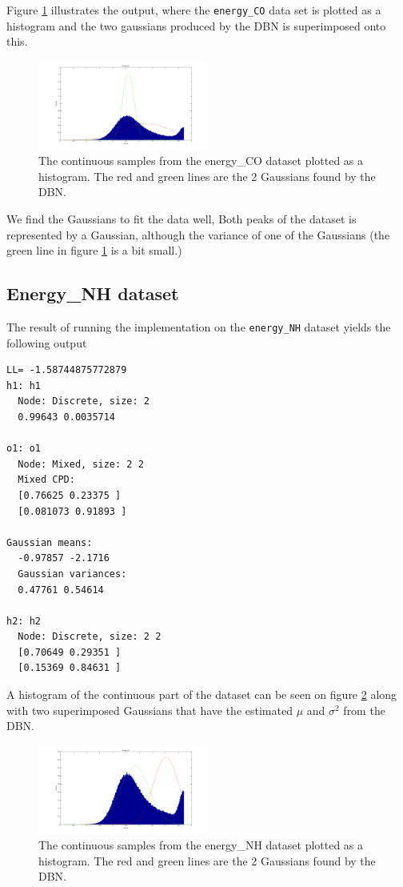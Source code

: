 \documentclass[10pt, journal, compsoc, a4paper]{IEEEtran}
\begin{document}
Figure \ref{fig4} illustrates the output, where the \texttt{energy\_CO} data set is plotted as a histogram and the two gaussians produced by the DBN is superimposed onto this. 

\begin{figure}[ht]
\centering
\includegraphics[width=0.5\textwidth]{figures/fig4.png}
\caption{The continuous samples from the energy\_CO dataset plotted as a histogram. The red and green lines are the 2 Gaussians found by the DBN.}
\label{fig4}
\end{figure}

We find the Gaussians to fit the data well, Both peaks of the dataset is represented by a Gaussian, although the variance of one of the Gaussians (the green line in figure \ref{fig4} is a bit small.)


\subsection{Energy\_NH dataset} %
\label{sub:energy_nh_dataset}
The result of running the implementation on the \texttt{energy\_NH} dataset yields the following output

\begin{verbatim}
LL= -1.58744875772879
h1: h1
  Node: Discrete, size: 2 
  0.99643 0.0035714 

o1: o1
  Node: Mixed, size: 2 2 
  Mixed CPD: 
  [0.76625 0.23375 ]
  [0.081073 0.91893 ]

Gaussian means: 
  -0.97857 -2.1716 
  Gaussian variances: 
  0.47761 0.54614 

h2: h2
  Node: Discrete, size: 2 2 
  [0.70649 0.29351 ]
  [0.15369 0.84631 ]
\end{verbatim}

A histogram of the continuous part of the dataset can be seen on figure \ref{fig5} along with two superimposed Gaussians that have the estimated $\mu$ and $\sigma^2$ from the DBN.

\begin{figure}[ht]
\centering
\includegraphics[width=0.5\textwidth]{figures/fig5.png}
\caption{The continuous samples from the energy\_NH dataset plotted as a histogram. The red and green lines are the 2 Gaussians found by the DBN.}
\label{fig5}
\end{figure}
\end{document}
